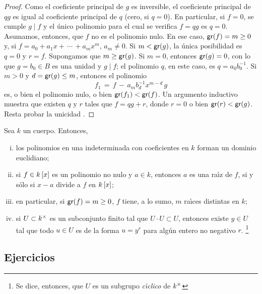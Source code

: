 \begin{proof}
	Como el coeficiente principal de $g$ es inversible, el coeficiente
	principal de $qg$ es igual al coeficiente principal de $q$
	(cero, si $q=0$). En particular, si $f=0$, se cumple
	$g\mid f$ y el \'unico polinomio para el cual se verifica $f=qg$
	es $q=0$. Asumamos, entonces, que $f$ no es el polinomio nulo. En
	ese caso, $\grado(f)=m\geq 0$ y, si $f=a_0+a_1x+\,\cdots\,+a_mx^m$,
	$a_m\neq 0$. Si $m<\grado(g)$, la \'unica posibilidad es
	$q=0$ y $r=f$. Supongamos que $m\geq \grado(g)$. Si $m=0$, entonces
	$\grado(g)=0$, con lo que $g=b_0\in B$ es una unidad y $g\mid f$;
	el polinomio $q$, en este caso, es $q=a_0b_0^{-1}$. Si $m>0$ y
	$d=\grado(g)\leq m$, entonces el polinomio
	\begin{displaymath}
		f_1\,=\,f\,-\,a_mb_d^{-1}x^{m-d}\,g
	\end{displaymath}
	es, o bien el polinomio nulo, o bien $\grado(f_1)<\grado(f)$.
	Un argumento inductivo muestra que existen $q$ y $r$ tales que
	$f=qg+r$, donde $r=0$ o bien $\grado(r)<\grado(g)$.
	Resta probar la unicidad \quedacomoejercicio.
\end{proof}

\begin{coroPolinomios}\label{coro:polinomios:algoritmo}
	Sea $k$ un cuerpo. Entonces,
	\begin{enumerate}[(i)]
		\item\label{item:coro:polinomios:algoritmo:euclidiano}
			los polinomios en una indeterminada con
			coeficientes en $k$ forman un dominio euclidiano;
		\item\label{item:coro:polinomios:algoritmo:raices}
			si $f\in\polinomios[x] k$ es un polinomio no nulo
			y $a\in k$, entonces $a$ es una ra\'{\i}z de $f$,
			si y s\'olo si $x-a$ divide a $f$ en $\polinomios[x] k$;
		\item\label{item:coro:polinomios:algoritmo:raices:bis}
			en particular, si $\grado(f)=m\geq 0$, $f$ tiene,
			a lo sumo, $m$ ra\'{\i}ces distintas en $k$;
		\item\label{item:coro:polinomios:algoritmo:finito}
			si $U\subset\Unidades k$ es un subconjunto finito
			tal que $U\cdot U\subset U$, entonces existe
			$y\in U$ tal que todo $u\in U$ es de la forma
			$u=y^r$ para alg\'un entero no negativo $r$.%
			\footnote{
				Se dice, entonces, que $U$ es un subgrupo
				\emph{c\'{\i}clico} de $\Unidades k$
			}
	\end{enumerate}
\end{coroPolinomios}

\subsection*{Ejercicios}


